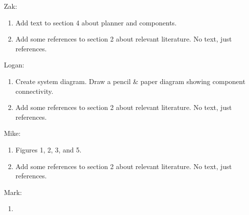 Zak:
\begin{enumerate}
\item
  Add text to section 4 about planner and components.
\item
  Add some references to section 2 about relevant literature. No text, just references.
\end{enumerate}

Logan:
\begin{enumerate}
\item
  Create system diagram.
  Draw a pencil \& paper diagram showing component connectivity.
\item
  Add some references to section 2 about relevant literature. No text, just references.
\end{enumerate}

Mike:
\begin{enumerate}
\item
  Figures 1, 2, 3, and 5.
\item
  Add some references to section 2 about relevant literature. No text, just references.
\end{enumerate}

Mark:
\begin{enumerate}
\item 
\end{enumerate}
